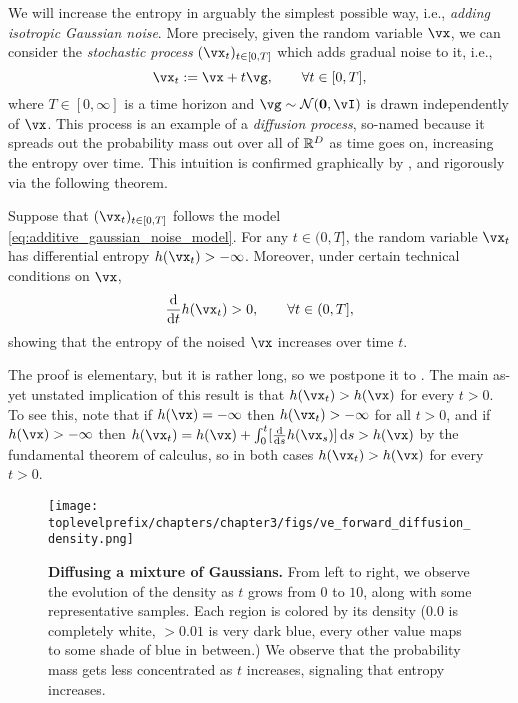 \documentclass[../../book-main.tex]{subfiles}
\begin{document}
We will increase the entropy in arguably the simplest possible way, i.e., \textit{adding isotropic Gaussian noise}. More precisely, given the random variable \(\vx\), we can consider the \textit{stochastic process} \((\vx_{t})_{t \in [0, T]}\) which adds gradual noise to it, i.e.,
\begin{equation}\label{eq:additive_gaussian_noise_model}
	\vx_{t} := \vx + t\vg, \qquad \forall t \in [0, T],
\end{equation}
where \(T \in [0, \infty]\) is a time horizon and \(\vg \sim \dNorm(\vzero, \vI)\) is drawn independently of \(\vx\). This process is an example of a \textit{diffusion process}, so-named because it spreads out the probability mass out over all of \(\mathbb{R}^{D}\) as time goes on, increasing the entropy over time. This intuition is confirmed graphically by , and rigorously via the following theorem.
\begin{theorem}
	Suppose that \((\vx_{t})_{t \in [0, T]}\) follows the model \eqref{eq:additive_gaussian_noise_model}. For any \(t \in (0, T]\), the random variable \(\vx_{t}\) has differential entropy \(h(\vx_{t}) > -\infty\). Moreover, under certain technical conditions on \(\vx\), 
	\begin{equation}
		\odv*{h(\vx_{t})}{t} > 0, \qquad \forall t \in (0, T],
	\end{equation}
	showing that the entropy of the noised \(\vx\) increases over time \(t\).
\end{theorem}
The proof is elementary, but it is rather long, so we postpone it to . The main as-yet unstated implication of this result is that \(h(\vx_{t}) > h(\vx)\) for every \(t > 0\). To see this, note that if \(h(\vx) = -\infty\) then \(h(\vx_{t}) > -\infty\) for all \(t > 0\),  and if \(h(\vx) > -\infty\) then \(h(\vx_{t}) = h(\vx) + \int_{0}^{t}[\odv*{h(\vx_{s})}{s}]\odif{s} > h(\vx)\) by the fundamental theorem of calculus, so in both cases \(h(\vx_{t}) > h(\vx)\) for every \(t > 0\).

\begin{figure}
	\texttt{[image: \\toplevelprefix/chapters/chapter3/figs/ve\_forward\_diffusion\_density.png]}
	\caption{\small\textbf{Diffusing a mixture of Gaussians.} From left to right, we observe the evolution of the density as \(t\) grows from \(0\) to \(10\), along with some representative samples. Each region is colored by its density (\(0.0\) is completely white, \(> 0.01\) is very dark blue, every other value maps to some shade of blue in between.) We observe that the probability mass gets less concentrated as \(t\) increases, signaling that entropy increases.}
	\label{fig:ve_forward_density}
\end{figure}
\end{document}
